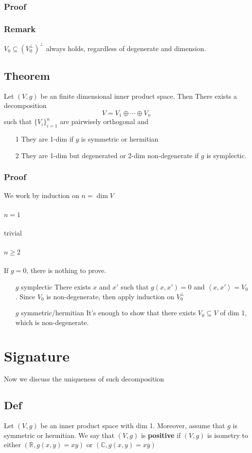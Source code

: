 \documentclass{book}
\begin{document}
\subsection*{Proof}
\subsection*{Remark}$V_0\subseteq(V_0^\bot)^\bot$ always holds, regardless of degenerate and dimension.
\section{Theorem}
\label{theorem 58.5}
Let $(V,g)$ be an finite dimensional inner product space. Then There exists a decomposition$$V=V_1\oplus\cdots\oplus V_n$$
such that $\{V_i\}_{i=1}^n$ are pairwisely orthogonal and \begin{itemize}
    \item [1] They are 1-dim if $g$ is symmetric or hermitian
    \item [2]They are 1-dim but degenerated or 2-dim non-degenerate if $g$ is symplectic.
\end{itemize}
\subsection*{Proof}We work by induction on $n=\dim V$
\subsubsection{$n=1$}trivial
\subsubsection{$n\geq 2$}If $g=0$, there is nothing to prove.
\begin{itemize}
    \item [$g$ symplectic]There exists $x$ and $x'$ such that $g(x,x')=0$ and $\left<x,x'\right>=V_0$. Since $V_0$ is non-degenerate, then apply induction on $V_0^\bot$
    \item [$g$ symmetric/hermitian]It's enough to show that there exists $V_0\subseteq V$ of dim 1, which is non-degenerate.
\end{itemize}
\chapter{Signature}
Now we discuss the uniqueness of such decomposition
\section{Def}
Let $(V,g)$ be an inner product space with dim 1. Moreover, assume that $g$ is symmetric or hermitian. We say that $(V,g)$ is \textbf{positive} if $(V,g)$ is isometry to either $(\mathbb{R},g(x,y)=xy)$ or $(\mathbb{C},g(x,y)=x\overline{y})$
\end{document}

